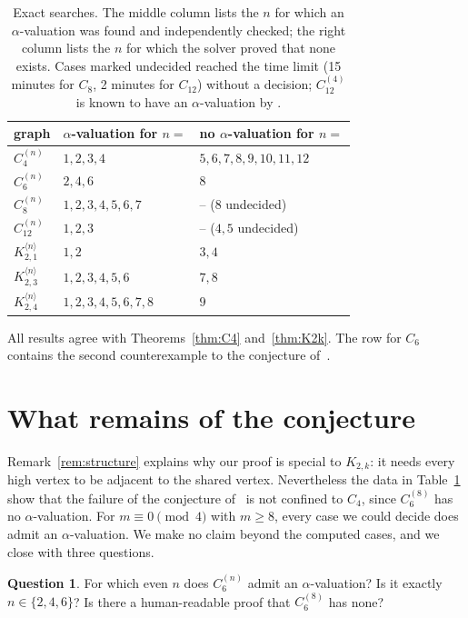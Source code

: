 \documentclass[11pt]{amsart}
\theoremstyle{definition}
\newtheorem{question}{Question}
\theoremstyle{remark}
\begin{document}
\begin{table}[ht]
\caption{Exact searches. The middle column lists the $n$ for which an $\alpha$-valuation was found and independently checked; the right column lists the $n$ for which the solver proved that none exists. Cases marked undecided reached the time limit (15 minutes for $C_8$, 2 minutes for $C_{12}$) without a decision; $C_{12}^{(4)}$ is known to have an $\alpha$-valuation by \cite[Theorem~3.8]{FIM}.}\label{tab:search}
\centering\small
\begin{tabular}{@{}lll@{}}
\toprule
graph & $\alpha$-valuation for $n =$ & no $\alpha$-valuation for $n =$ \\
\midrule
$C_{4}^{(n)}$ & $1, 2, 3, 4$ & $5, 6, 7, 8, 9, 10, 11, 12$ \\
$C_{6}^{(n)}$ & $2, 4, 6$ & $8$ \\
$C_{8}^{(n)}$ & $1, 2, 3, 4, 5, 6, 7$ & -- ($8$ undecided) \\
$C_{12}^{(n)}$ & $1, 2, 3$ & -- ($4, 5$ undecided) \\
$K_{2,1}^{\langle n\rangle}$ & $1, 2$ & $3, 4$ \\
$K_{2,3}^{\langle n\rangle}$ & $1, 2, 3, 4, 5, 6$ & $7, 8$ \\
$K_{2,4}^{\langle n\rangle}$ & $1, 2, 3, 4, 5, 6, 7, 8$ & $9$ \\
\bottomrule
\end{tabular}
\end{table}

All results agree with Theorems~\ref{thm:C4} and~\ref{thm:K2k}. The row for $C_6$ contains the second counterexample to the conjecture of~\cite{FIM}.

\section{What remains of the conjecture}\label{sec:open}

Remark~\ref{rem:structure} explains why our proof is special to $K_{2,k}$: it needs every high vertex to be adjacent to the shared vertex. Nevertheless the data in Table~\ref{tab:search} show that the failure of the conjecture of~\cite{FIM} is not confined to $C_4$, since $C_6^{(8)}$ has no $\alpha$-valuation. For $m \equiv 0 \pmod 4$ with $m \ge 8$, every case we could decide does admit an $\alpha$-valuation. We make no claim beyond the computed cases, and we close with three questions.

\begin{question}
For which even $n$ does $C_6^{(n)}$ admit an $\alpha$-valuation? Is it exactly $n \in \{2, 4, 6\}$? Is there a human-readable proof that $C_6^{(8)}$ has none?
\end{question}
\end{document}
